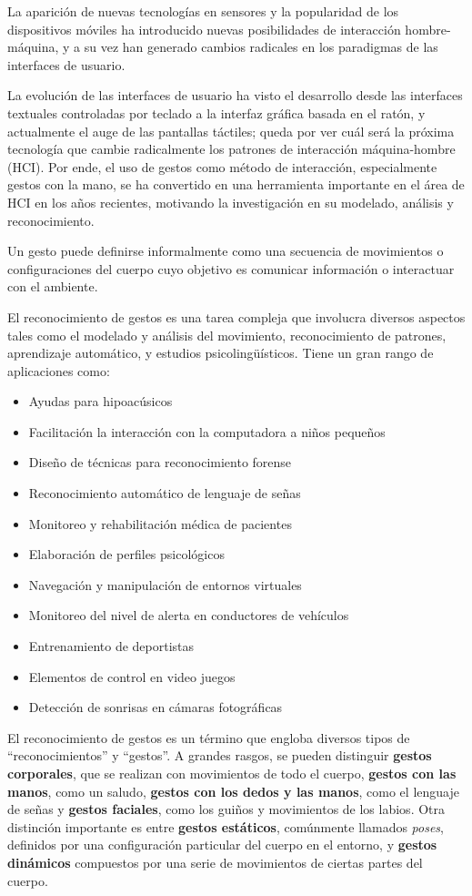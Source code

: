 
La aparición de nuevas tecnologías en sensores y la popularidad de los dispositivos móviles ha introducido nuevas posibilidades de interacción hombre-máquina, y a su vez han generado cambios radicales en los paradigmas de las interfaces de usuario. 

La evolución de las interfaces de usuario ha visto el desarrollo desde las interfaces textuales controladas por teclado a la interfaz gráfica basada en el ratón, y actualmente el auge de las pantallas táctiles; queda por ver cuál será la próxima tecnología que cambie radicalmente los patrones de interacción máquina-hombre (HCI). Por ende, el uso de gestos como método de interacción, especialmente gestos con la mano, se ha convertido en una herramienta importante en el área de HCI en los años recientes, motivando la investigación en su modelado, análisis y reconocimiento.

Un gesto puede definirse informalmente como una secuencia de movimientos o configuraciones del cuerpo cuyo objetivo es comunicar información o interactuar con el ambiente. 

El reconocimiento de gestos es una tarea compleja que involucra diversos aspectos tales como el modelado y análisis del movimiento, reconocimiento de patrones, aprendizaje automático, y estudios psicolingüísticos. Tiene un gran rango de aplicaciones como:

\begin{itemize}
\item Ayudas para hipoacúsicos
\item Facilitación la interacción con la computadora a niños pequeños
\item Diseño de técnicas para reconocimiento forense
\item Reconocimiento automático de lenguaje de señas
\item Monitoreo y rehabilitación médica de pacientes
\item Elaboración de perfiles psicológicos
\item Navegación y manipulación de entornos virtuales
\item Monitoreo del nivel de alerta en conductores de vehículos
\item Entrenamiento de deportistas
\item Elementos de control en video juegos
\item Detección de sonrisas en cámaras fotográficas
\end{itemize}


El reconocimiento de gestos es un término que engloba diversos tipos de ``reconocimientos'' y ``gestos''. A grandes rasgos, se pueden distinguir \textbf{gestos corporales}, que se realizan con movimientos de todo el cuerpo, \textbf{gestos con las manos}, como un saludo, \textbf{gestos con los dedos y las manos}, como el lenguaje de señas y \textbf{gestos faciales}, como los guiños y movimientos de los labios. Otra distinción importante es entre \textbf{gestos estáticos}, comúnmente llamados \textit{poses}, definidos por una configuración particular del cuerpo en el entorno, y \textbf{gestos dinámicos} compuestos por una serie de movimientos de ciertas partes del cuerpo. 

